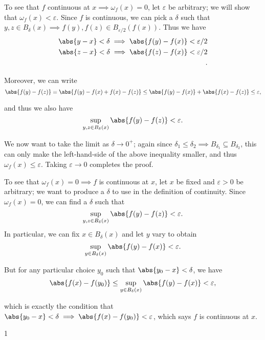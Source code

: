 \begin{solution}
\begin{enumerate}
    To see that $f$ continuous at $x \implies \omega_f(x) = 0$, let $\varepsilon$ be arbitrary; we will show that $\omega_f(x) < \varepsilon$. Since $f$ is continuous, we can pick a $\delta$ such that $y,z \in B_\delta(x) \implies f(y), f(z) \in B_{\varepsilon/2}(f(x))$. Thus we have
\[
  \begin{align*}
    \abs{y-x} < \delta \implies \abs{f(y) - f(x)} < \varepsilon/2 \\
    \abs{z-x} < \delta \implies \abs{f(z) - f(x)} < \varepsilon/2 \\
  .\end{align*}
\]

  Moreover, we can write
  $$
  \abs{f(y) - f(z)} = \abs{f(y) - f(x) + f(x) - f(z)} \leq \abs{f(y) - f(x)} + \abs{f(x) - f(z)} \leq \varepsilon,
  $$

  and thus we also have
  $$
  \sup_{y, z \in B_\delta(x)} \abs{f(y) - f(z)} < \varepsilon.
  $$

  We now want to take the limit as $\delta \to 0^+$; again since $\delta_1 \leq \delta_2 \implies B_{\delta_1} \subseteq B_{\delta_2}$, this can only make the left-hand-side of the above inequality smaller, and thus $\omega_f(x) \leq \varepsilon$. Taking $\varepsilon \to 0$ completes the proof.


  To see that $\omega_f(x) = 0 \implies f$ is continuous at $x$, let $x$ be fixed and $\varepsilon > 0$ be arbitrary; we want to produce a $\delta$ to use in the definition of continuity. Since $\omega_f(x) = 0$, we can find a $\delta$ such that
  $$
  \sup_{y, z \in B_\delta(x)} \abs{f(y) - f(z)} < \varepsilon.
  $$
  In particular, we can fix $x\in B_\delta(x)$ and let $y$ vary to obtain
  $$
  \sup_{y\in B_\delta(x)} \abs{f(y) - f(x)} < \varepsilon.
  $$

  But for any particular choice $y_0$ such that $\abs{y_0 - x} < \delta$, we have
  $$
  \abs{f(x) - f(y_0)} \leq\sup_{y\in B_\delta(x)} \abs{f(y) - f(x)} < \varepsilon,
  $$

  which is exactly the condition that $\abs{y_0 - x} < \delta \implies \abs{f(x) - f(y_0)} < \varepsilon$, which says $f$ is continuous at $x$.
\end{enumerate}1
\end{solution}




